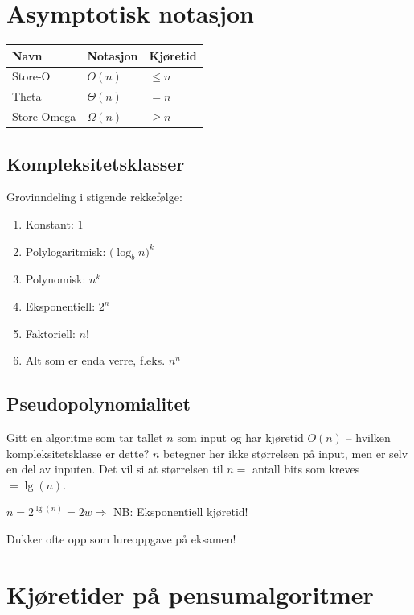 \documentclass[a4paper, norsk,  10pt]{article}
\begin{document}
\section{Asymptotisk notasjon}

\begin{center}
\begin{tabular}{|l|l|l|}
    \hline
    Navn & Notasjon & Kjøretid \\ \hline
    Store-O & $O(n)$ & $\le n$ \\ \hline
    Theta & $\Theta(n)$ & $= n$ \\ \hline
    Store-Omega & $\Omega(n)$ & $\ge n$ \\ \hline
\end{tabular}
\end{center}

\subsection{Kompleksitetsklasser}

Grovinndeling i stigende rekkefølge:

\begin{enumerate}
\item Konstant: $1$
\item Polylogaritmisk: ${{(\log_{b}n})^{k}}$
\item Polynomisk: $n^k$
\item Eksponentiell: ${2^{n}}$
\item Faktoriell: $n!$
\item Alt som er enda verre, f.eks. $n^n$
\end{enumerate}

\subsection{Pseudopolynomialitet}

Gitt en algoritme som tar tallet $n$ som input og har kjøretid $O(n)$ – hvilken kompleksitetsklasse er dette? $n$ betegner her ikke størrelsen på input, men er selv en del av inputen. Det vil si at størrelsen til $n =$ antall bits som kreves $= \lg(n)$. 

\begin{center}
$n = {2^{\lg(n)}} = 2w \Rightarrow$ NB: Eksponentiell kjøretid! \
\end{center}

Dukker ofte opp som lureoppgave på eksamen!

\section{Kjøretider på pensumalgoritmer}
\end{document}
